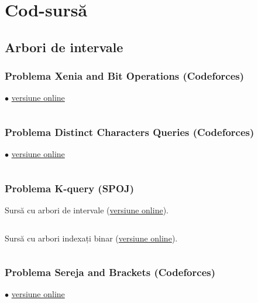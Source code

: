 \appendix

\chapter{Cod-sursă}

\section{Arbori de intervale}

\subsection{Problema Xenia and Bit Operations (Codeforces)}
\label{code:xenia-and-bit-operations}
$\bullet$
\href{https://codeforces.com/contest/339/submission/280956091}{versiune online}

\inputminted{cpp}{src/segment-trees/xenia-and-bit-operations.cpp}

\subsection{Problema Distinct Characters Queries (Codeforces)}
\label{code:distinct-characters-queries}
$\bullet$
\href{https://codeforces.com/contest/1234/submission/341304487}{versiune online}

\inputminted{cpp}{src/segment-trees/distinct-characters-queries.cpp}

\subsection{Problema K-query (SPOJ)}
\label{code:k-query}

Sursă cu arbori de intervale (\href{https://github.com/CatalinFrancu/nerdvana/blob/main/problems/spoj/kquery/cata-segtree-decreasing-k.cpp}{versiune online}).

\inputminted{cpp}{src/segment-trees/k-query.cpp}

Sursă cu arbori indexați binar (\href{https://github.com/CatalinFrancu/nerdvana/blob/main/problems/spoj/kquery/cata-fenwick-decreasing-k.cpp}{versiune online}).

\inputminted{cpp}{src/fenwick-trees/k-query.cpp}

\subsection{Problema Sereja and Brackets (Codeforces)}
\label{code:sereja-and-brackets}
$\bullet$
\href{https://codeforces.com/contest/380/submission/280972559}{versiune online}

